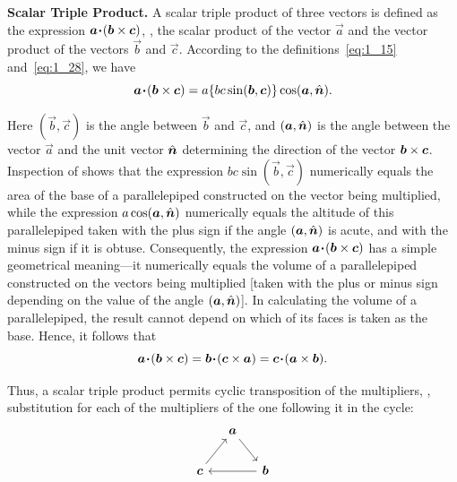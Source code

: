 \textbf{Scalar Triple Product.} A scalar triple product of three vectors is defined as the expression $\boldsymbol{a}\!\boldsymbol{\cdot}\!(\boldsymbol{b}\times\boldsymbol{c})$, \ie, the scalar product of the vector $\vec{a}$ and the vector product of the vectors $\vec{b}$ and $\vec{c}$. According to the definitions~\eqref{eq:1_15} and~\eqref{eq:1_28}, we have
\begin{equation*}
\boldsymbol{a}\!\boldsymbol{\cdot}\!(\boldsymbol{b}\times\boldsymbol{c}) = a\{bc\sin(\boldsymbol{b}, \boldsymbol{c})\}\cos(\boldsymbol{a},\hat{\boldsymbol{n}}).
\end{equation*}

\noindent
Here $(\vec{b},\vec{c})$ is the angle between $\vec{b}$ and $\vec{c}$, and $(\boldsymbol{a},\hat{\boldsymbol{n}})$ is the angle between the vector $\vec{a}$ and the unit vector $\hat{\boldsymbol{n}}$ determining the direction of the vector $\boldsymbol{b}\times\boldsymbol{c}$. Inspection of  shows that the expression $bc\sin(\vec{b},\vec{c})$ numerically equals the area of the base of a parallelepiped constructed on the vector being multiplied, while the expression $a\cos(\boldsymbol{a},\hat{\boldsymbol{n}})$ numerically equals the altitude of this parallelepiped taken with the plus sign if the angle $(\boldsymbol{a},\hat{\boldsymbol{n}})$ is acute, and with the minus sign if it is obtuse. Consequently, the expression $\boldsymbol{a}\!\boldsymbol{\cdot}\!(\boldsymbol{b}\times\boldsymbol{c})$ has a simple geometrical meaning---it numerically equals the volume of a parallelepiped constructed on the vectors being multiplied [taken with the plus or minus sign depending on the value of the angle $(\boldsymbol{a},\hat{\boldsymbol{n}})$]. In calculating the volume of a parallelepiped, the result cannot depend on which of its faces is taken as the base. Hence, it follows that
\begin{equation}\label{eq:1_34}
\boldsymbol{a}\!\boldsymbol{\cdot}\!(\boldsymbol{b}\times\boldsymbol{c}) = \boldsymbol{b}\!\boldsymbol{\cdot}\!(\boldsymbol{c}\times\boldsymbol{a}) = \boldsymbol{c}\!\boldsymbol{\cdot}\!(\boldsymbol{a}\times\boldsymbol{b}).
\end{equation}

\noindent
Thus, a scalar triple product permits cyclic transposition of the multipliers, \ie, substitution for each of the multipliers of the one following it in the cycle:
\begin{equation*}
\begin{tikzcd}[column sep=small]
             & \vec{a} \arrow[rd] &              \\
\vec{c} \arrow[ru] &              & \vec{b} \arrow[ll]
\end{tikzcd}
\end{equation*}

